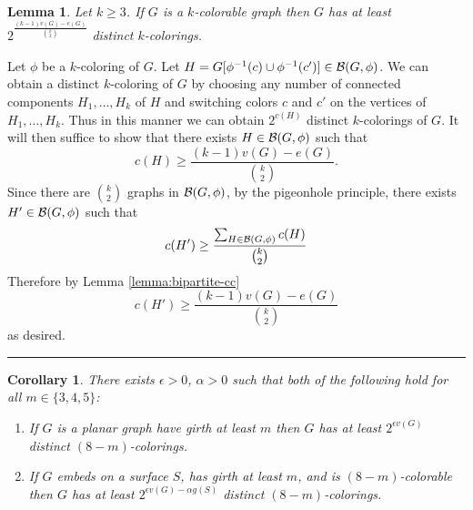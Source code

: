 \documentclass[letterpaper,12pt,oneside,onecolumn]{article}
\newenvironment{proof}{{\bf Proof:  }}{\hfill\rule{2mm}{2mm}}
\newtheorem{lemma}[fact]{Lemma}
\newtheorem{corollary}[fact]{Corollary}
\begin{document}
\begin{lemma}
Let $k\geq 3$. If $G$ is a $k$-colorable graph then $G$ has at least $2^{\frac{(k-1)v(G) - e(G)}{{k \choose 2}}}$ distinct $k$-colorings.
\end{lemma}
\begin{proof}
Let $\phi$ be a $k$-coloring of $G$. Let $H = G[\phi^{-1}(c) \cup \phi^{-1}(c')] \in \mathcal{B}(G,\phi)$. We can obtain a distinct $k$-coloring of $G$ by choosing any number of connected components $H_1, \dots, H_k$ of $H$ and switching colors $c$ and $c'$ on the vertices of $H_1, \dots, H_k$. Thus in this manner we can obtain $2^{c(H)}$ distinct $k$-colorings of $G$. It will then suffice to show that there exists $H \in \mathcal{B}(G,\phi)$ such that
$$c(H) \geq \frac{(k-1)v(G) - e(G)}{{k \choose 2}}.$$
Since there are ${k\choose 2}$ graphs in $\mathcal{B}(G,\phi)$, by the pigeonhole principle, there exists $H' \in \mathcal{B}(G,\phi)$ such that
$$c(H') \geq \frac{\sum_{H \in \mathcal{B}(G,\phi)} c(H)}{{k\choose 2}}$$
Therefore by Lemma \ref{lemma:bipartite-cc} 
$$c(H') \geq \frac{(k-1)v(G) - e(G)}{{k\choose 2}}$$
as desired.
\end{proof}
\begin{corollary}
There exists $\epsilon >0$, $\alpha > 0$ such that both of the following hold for all $m \in \{3,4,5\}$:
\begin{enumerate}
\item If $G$ is a planar graph have girth at least $m$ then $G$ has at least $2^{\epsilon v(G)}$ distinct $(8-m)$-colorings.
\item If $G$ embeds on a surface $S$, has girth at least $m$, and is $(8-m)$-colorable then $G$ has  at least $2^{\epsilon v(G) - \alpha g(S)}$ distinct $(8-m)$-colorings.
\end{enumerate}
\end{corollary}
\end{document}
